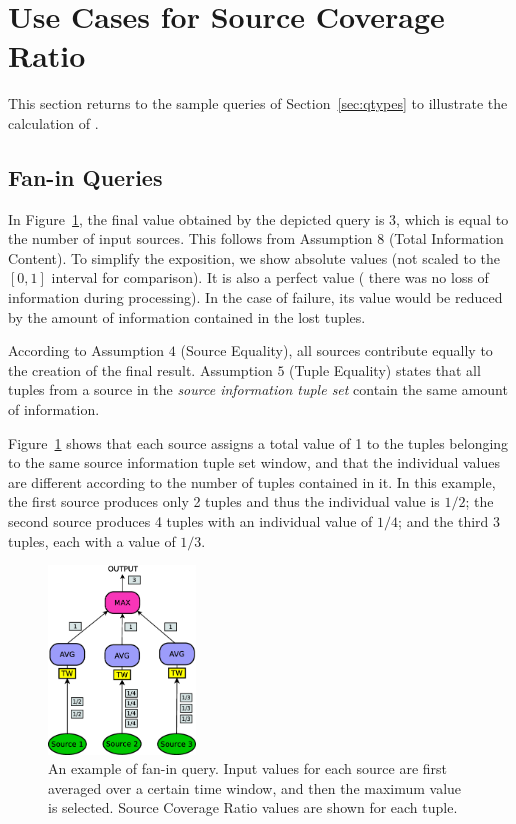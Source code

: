 \section{Use Cases for Source Coverage Ratio}
\label{sec:apps}

This section returns to the sample queries of Section~\ref{sec:qtypes} to illustrate the
calculation of \sic.
\vspace{-10pt}
\subsection*{Fan-in Queries}

In Figure~\ref{fig:query_fanin2}, the final \sic value obtained by the depicted query is $3$, which is
equal to the number of input sources.
This follows from Assumption $8$ (Total Information Content). To simplify the exposition, we show
absolute values (\ie not scaled to the $[0,1]$ interval for comparison). It is also a perfect value (\ie
there was no loss of information during processing). In the case of failure, its value
would be reduced by the amount of information contained in the lost tuples.

According to Assumption $4$ (Source Equality), all sources contribute equally to the creation of the
final result.
Assumption $5$ (Tuple Equality) states that all tuples from a source in the \textit{source
information tuple set} contain the same amount of information. 

Figure~\ref{fig:query_fanin2} shows that
each source assigns a total value of 1 to the tuples belonging to the same source information tuple set window, and
that the individual \sic values are different according to the number of tuples contained in it. In this
example, the first source produces only 2 tuples and thus the individual \sic value is $1/2$; the second
source produces 4 tuples with an individual value of $1/4$; and the third 3 tuples, each with a value of
$1/3$.
\begin{figure}[h] \centering \includegraphics[width=0.35\textwidth]{img/tesi/query_fanin} \caption{An example of fan-in query. Input values for each source are first averaged over a certain time window, and
then the maximum value is selected. Source Coverage Ratio values are shown for each tuple.}
\label{fig:query_fanin2}
\end{figure}

